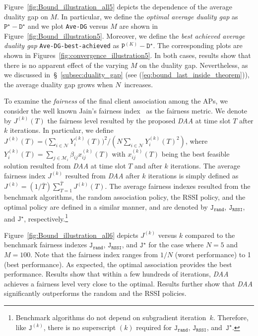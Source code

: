 \documentclass[journal, 10pt, twocolumn]{IEEEtran}
\begin{document}
Figure~\ref{fig:Bound_illustration_all5} depicts the dependence of the average duality gap on $M$. In particular, we define the \emph{optimal average duality gap} as $\texttt{P}^\star-\texttt{D}^\star$ and we plot \texttt{Ave-DG} versus $M$ are shown in Figure~\ref{fig:Bound_illustration5}. Moreover, we define the \emph{best achieved average duality gap} \texttt{Ave-DG-best-achieved} as $\texttt{P}^{(K)}-\texttt{D}^\star$. The corresponding plots are shown in Figures~\ref{fig:convergence_illustration5}. In both cases, results show that there is no apparent effect of the varying $M$ on the duality gap. Nevertheless, as we discussed in~\S~\ref{subsec:duality_gap} (see (\ref{eq:bound_last_inside_theorem})), the average duality gap grows when $N$~increases.

To examine the \emph{fairness} of the final client association among the APs, we consider the well known Jain's fairness index~\cite{Walrand00} as the fairness metric. We denote by $J^{(k)}(T)$ the fairness level resulted by the proposed \emph{DAA} at time slot $T$ after $k$ iterations. In particular, we define $J^{(k)}(T)= \big(\sum_{i\in\mathcal{N}}Y^{(k)}_i(T)\big)^2/(N\sum_{i\in\mathcal{N}}Y^{(k)}_i(T)^2)$, where $Y^{(k)}_i(T)=\sum_{j\in\mathcal{M}_i}\beta_{ij}x^{(k)}_{ij}(T)$ with $x^{(k)}_{ij}(T)$ being the best feasible solution resulted from \emph{DAA} at time slot $T$ and after $k$ iterations. The average fairness index $J^{(k)}$ resulted from \emph{DAA} after $k$ iterations is simply defined as $J^{(k)}=(1/\bar T)\sum_{T=1}^{\bar T}J^{(k)}(T)$. The average fairness indexes resulted from the benchmark algorithms, the random association policy, the RSSI policy, and the optimal policy are defined in a similar manner, and are denoted by $\texttt{J}_{\texttt{rand}}$, $\texttt{J}_{\texttt{RSSI}}$, and $\texttt{J}^\star$, respectively.\footnote{Benchmark algorithms do not depend on subgradient iteration~$k$. Therefore, like $\texttt{J}^{(k)}$, there is no superscript $(k)$ required for $\texttt{J}_{\texttt{rand}}$, $\texttt{J}_{\texttt{RSSI}}$, and~$\texttt{J}^\star$.}

Figure~\ref{fig:Bound_illustration_all6} depicts $J^{(k)}$ versus $k$ compared to the benchmark fairness indexes $\texttt{J}_{\texttt{rand}}$, $\texttt{J}_{\texttt{RSSI}}$, and $\texttt{J}^\star$ for the case where $N=5$ and $M=100$. Note that the fairness index ranges from $1/N$ (worst performance) to 1 (best performance). As expected, the optimal association provides the best performance. Results show that within a few hundreds of iterations, \emph{DAA} achieves a fairness level very close to the optimal. Results further show that \emph{DAA} significantly outperforms the random and the RSSI policies.
\end{document}
